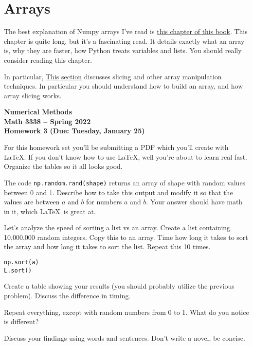 \documentclass[11pt,letterpaper]{article}
\newcommand{\semester}{Spring 2022}
\newcommand{\due}{Tuesday, January 25}
\begin{document}
\section{Arrays}
The best explanation of Numpy arrays I've read is 
\href{https://jakevdp.github.io/PythonDataScienceHandbook/02.00-introduction-to-numpy.html}{this chapter of this book}.
This chapter is quite long, but it's a fascinating read. It details exactly what an array is, why
they are faster, how Python treats variables and lists. You should really consider reading this
chapter. 

In particular, 
\href{https://jakevdp.github.io/PythonDataScienceHandbook/02.02-the-basics-of-numpy-arrays.html}{This 
section} discusses slicing and other array manipulation techniques. In particular you should understand
how to build an array, and how array slicing works.







\newpage

\begin{center}
{\huge{\bf  Numerical Methods}} \\[1.5ex]
{\bf Math 3338 -- \semester}\\[1.5ex]
{\Large{\bf Homework 3 (Due: \due)}}\\
\end{center}
\vspace{2mm}

For this homework set you'll be submitting a PDF which you'll create with \LaTeX. If you don't know how to use \LaTeX, well you're about to learn real fast. Organize the tables so it all looks good. 


\begin{problem}
The code \texttt{np.random.rand(shape)} returns an array of shape with random values between 0 and 1. Describe how to take this output and modify it so that the values are between $a$ and $b$ for numbers $a$ and $b$. Your answer should have math in it, which \LaTeX\ is great at.
\end{problem}



\begin{problem}
Let's analyze the speed of sorting a list vs an array. Create a list containing 10,000,000 random
integers. Copy this to an array. Time how long it takes to sort the array and how long it takes to
sort the list. Repeat this 10 times. 
\begin{verbatim}
np.sort(a)
L.sort()
\end{verbatim}
Create a table showing your results (you should probably utilize the previous problem). Discuss the 
difference in timing. 

Repeat everything, except with random numbers from 0 to 1. What do you notice is different?

Discuss your findings using words and sentences. Don't write a novel, be concise. 
\end{problem}
\end{document}
